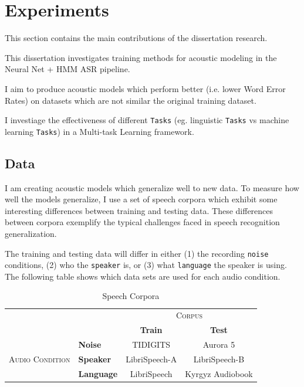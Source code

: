 \documentclass[10pt,a4paper]{article}
\begin{document}
\section{Experiments}

This section contains the main contributions of the dissertation research.

This dissertation investigates training methods for acoustic modeling in the Neural Net + HMM ASR pipeline.

I aim to produce acoustic models which perform better (i.e. lower Word Error Rates) on datasets which are not similar the original training dataset.

I investiage the effectiveness of different \texttt{Tasks} (eg. linguistic \texttt{Tasks} vs machine learning \texttt{Tasks}) in a Multi-task Learning framework.


\subsection{Data}

I am creating acoustic models which generalize well to new data. To measure how well the models generalize, I use a set of speech corpora which exhibit some interesting differences between training and testing data. These differences between corpora exemplify the typical challenges faced in speech recognition generalization.

The training and testing data will differ in either (1) the recording \texttt{noise} conditions, (2) who the \texttt{speaker} is, or (3) what \texttt{language} the speaker is using. The following table shows which data sets are used for each audio condition.


\begin{table}[htbp]
  \centering
  \begin{adjustbox}{width=.75\textwidth}
    \begin{tabular}{clcc}
      \toprule
      && \multicolumn{2}{c}{\textsc{Corpus}}\\
      && \textbf{Train} & \textbf{Test}\\
      \midrule
      \multirow{3}{*}{\textsc{Audio Condition}} &\textbf{Noise} & TIDIGITS & Aurora 5 \\
      &\textbf{Speaker} & LibriSpeech-A & LibriSpeech-B \\
      &\textbf{Language} & LibriSpeech & Kyrgyz Audiobook \\
      \bottomrule
    \end{tabular}
    \label{table:data}
  \end{adjustbox}
  
  \caption{Speech Corpora}
  
\end{table}
\end{document}
